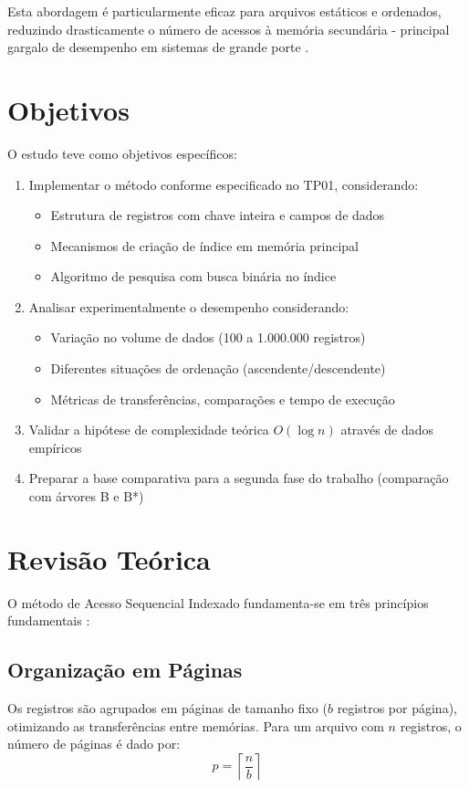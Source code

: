 \documentclass[12pt,a4paper,brazil]{article}
\begin{document}
Esta abordagem é particularmente eficaz para arquivos estáticos e ordenados, reduzindo drasticamente o número de acessos à memória secundária - principal gargalo de desempenho em sistemas de grande porte \cite{sedgewick2011}.

\section{Objetivos}
O estudo teve como objetivos específicos:
\begin{enumerate}
    \item Implementar o método conforme especificado no TP01, considerando:
    \begin{itemize}
        \item Estrutura de registros com chave inteira e campos de dados
        \item Mecanismos de criação de índice em memória principal
        \item Algoritmo de pesquisa com busca binária no índice
    \end{itemize}
    
    \item Analisar experimentalmente o desempenho considerando:
    \begin{itemize}
        \item Variação no volume de dados (100 a 1.000.000 registros)
        \item Diferentes situações de ordenação (ascendente/descendente)
        \item Métricas de transferências, comparações e tempo de execução
    \end{itemize}
    
    \item Validar a hipótese de complexidade teórica \(O(\log n)\) através de dados empíricos
    
    \item Preparar a base comparativa para a segunda fase do trabalho (comparação com árvores B e B*)
\end{enumerate}

\section{Revisão Teórica}
O método de Acesso Sequencial Indexado fundamenta-se em três princípios fundamentais \cite{ziviani2010}:

\subsection{Organização em Páginas}
Os registros são agrupados em páginas de tamanho fixo (\(b\) registros por página), otimizando as transferências entre memórias. Para um arquivo com \(n\) registros, o número de páginas é dado por:
\[
p = \left\lceil \frac{n}{b} \right\rceil
\]
\end{document}
